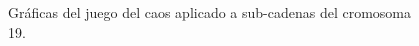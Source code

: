 \documentclass[letterpaper,12pt,oneside]{book}
\begin{document}
\begin{figure}[h!]
\begin{minipage}{.3\linewidth}
\end{minipage}\par\medskip

\centering
\begin{minipage}{0.3\linewidth}
\centering
{}
\end{minipage}%
\begin{minipage}{0.3\linewidth}
\centering
{}
\end{minipage}

\caption{Gráficas del juego del caos aplicado a sub-cadenas del cromosoma 19. }
\label{fig:dim_ch19}
\end{figure}


\end{document}
